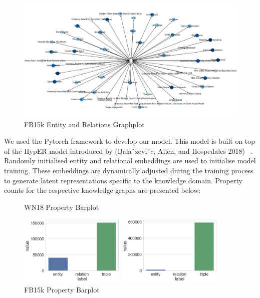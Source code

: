 \begin{figure}[H]
  	\caption{FB15k Entity and Relations Graphplot}
   	\centering
    	\includegraphics[width=\textwidth]{FB15k_Graph}
\end{figure}


We used the Pytorch framework to develop our model. This model is built on top of the HypER model introduced by (Balaˇzevi´c, Allen, and Hospedales 2018) ~\citep{balazevic2019hypernetwork}.  Randomly initialised entity and relational embeddings are used to initialise model training. These embeddings are dynamically adjusted during the training process to generate latent representations specific to the knowledge domain. Property counts for the respective knowledge graphs are presented below:

\begin{figure}[H]
	\parbox{.5\linewidth}{
   		\caption{WN18 Property Barplot}
   		\centering
    		\includegraphics[width=0.45\textwidth]{WN18_Counts}
		}
	\hfill
	\parbox{.5\linewidth}{
		\caption{FB15k Property Barplot}
   		\centering
    		\includegraphics[width=0.45\textwidth]{FB15k_Counts}
		}
\end{figure}

